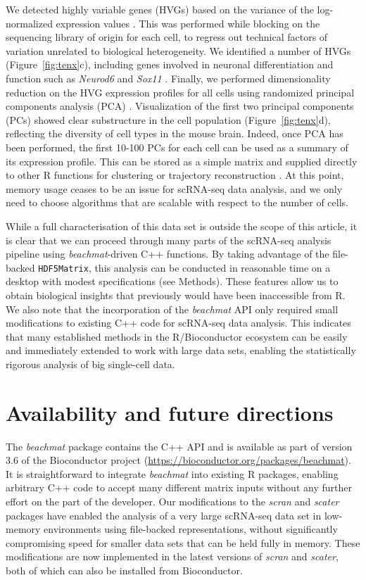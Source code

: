 \documentclass[10pt,letterpaper]{article}
\newcommand{\beachmat}{\textit{beachmat}}
\newcommand{\code}[1]{\texttt{#1}}
\begin{document}
We detected highly variable genes (HVGs) based on the variance of the log-normalized expression values \cite{lun2016stepbystep}.
This was performed while blocking on the sequencing library of origin for each cell, to regress out technical factors of variation unrelated to biological heterogeneity.
We identified a number of HVGs (Figure~\ref{fig:tenx}c), including genes involved in neuronal differentiation and function such as \textit{Neurod6} \cite{ kay2011neurod6} and \textit{Sox11} \cite{bergsland2006establishment}. 
Finally, we performed dimensionality reduction on the HVG expression profiles for all cells using randomized principal components analysis (PCA) \cite{halko2011finding}.
Visualization of the first two principal components (PCs) showed clear substructure in the cell population (Figure~\ref{fig:tenx}d), reflecting the diversity of cell types in the mouse brain.
Indeed, once PCA has been performed, the first 10-100 PCs for each cell can be used as a summary of its expression profile.
This can be stored as a simple matrix and supplied directly to other R functions for clustering \cite{xu2015identification,csardi2006igraph} or trajectory reconstruction \cite{trapnell2014dynamics}.
At this point, memory usage ceases to be an issue for scRNA-seq data analysis, and we only need to choose algorithms that are scalable with respect to the number of cells.

While a full characterisation of this data set is outside the scope of this article, it is clear that we can proceed through many parts of the scRNA-seq analysis pipeline using \beachmat{}-driven C++ functions.
By taking advantage of the file-backed \code{HDF5Matrix}, this analysis can be conducted in reasonable time on a desktop with modest specifications (see Methods).
These features allow us to obtain biological insights that previously would have been inaccessible from R.
We also note that the incorporation of the \beachmat{} API only required small modifications to existing C++ code for scRNA-seq data analysis.
This indicates that many established methods in the R/Bioconductor ecosystem can be easily and immediately extended to work with large data sets,
enabling the statistically rigorous analysis of big single-cell data.

\section*{Availability and future directions}
The \beachmat{} package contains the C++ API and is available as part of version 3.6 of the Bioconductor project (\url{https://bioconductor.org/packages/beachmat}).
It is straightforward to integrate \beachmat{} into existing R packages, enabling arbitrary C++ code to accept many different matrix inputs without any further effort on the part of the developer.
Our modifications to the \textit{scran} and \textit{scater} packages have enabled the analysis of a very large scRNA-seq data set in low-memory environments using file-backed representations, without significantly compromising speed for smaller data sets that can be held fully in memory.
These modifications are now implemented in the latest versions of \textit{scran} and \textit{scater}, both of which can also be installed from Bioconductor.
\end{document}
